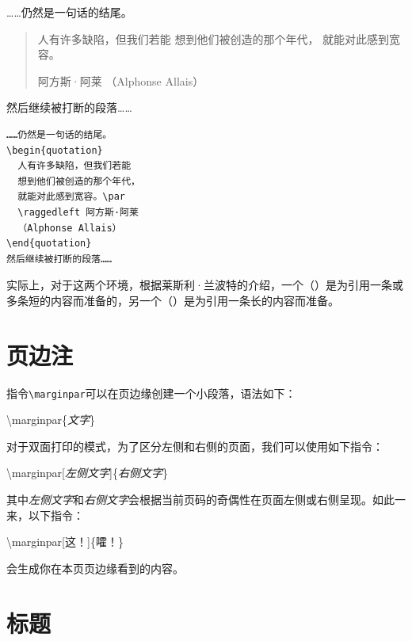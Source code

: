\begin{codelist}[2.16]{
  ……仍然是一句话的结尾。
\begin{quotation}
  人有许多缺陷，但我们若能
  想到他们被创造的那个年代，
  就能对此感到宽容。\par
  \raggedleft 阿方斯·阿莱
  （Alphonse Allais）
\end{quotation}
然后继续被打断的段落……
}\begin{verbatim}
……仍然是一句话的结尾。
\begin{quotation}
  人有许多缺陷，但我们若能
  想到他们被创造的那个年代，
  就能对此感到宽容。\par
  \raggedleft 阿方斯·阿莱
  （Alphonse Allais）
\end{quotation}
然后继续被打断的段落……
\end{verbatim}
\end{codelist}

实际上，对于这两个环境，根据莱斯利·兰波特的介绍，一个（）是为引用一条或多条短的内容而准备的，另一个（）是为引用一条长的内容而准备。

\section{页边注}

指令\verb|\marginpar|可以在页边缘创建一个小段落，语法如下：

\begin{dmd}
\backslash marginpar\{\textsl{\<文字\>}\}
\end{dmd}

对于双面打印的模式，为了区分左侧和右侧的页面，我们可以使用如下指令：

\begin{dmd}
\backslash marginpar[\textsl{\<左侧文字\>}]\{\textsl{\<右侧文字\>}\}
\end{dmd}

其中\textsl{\<左侧文字\>}和\textsl{\<右侧文字\>}会根据当前页码的奇偶性在页面左侧或右侧呈现。如此一来，以下指令：

\begin{dmd}
\backslash marginpar[这！]\{嚯！\}
\end{dmd}

会生成你在本页页边缘看到的内容。

\section{标题}

